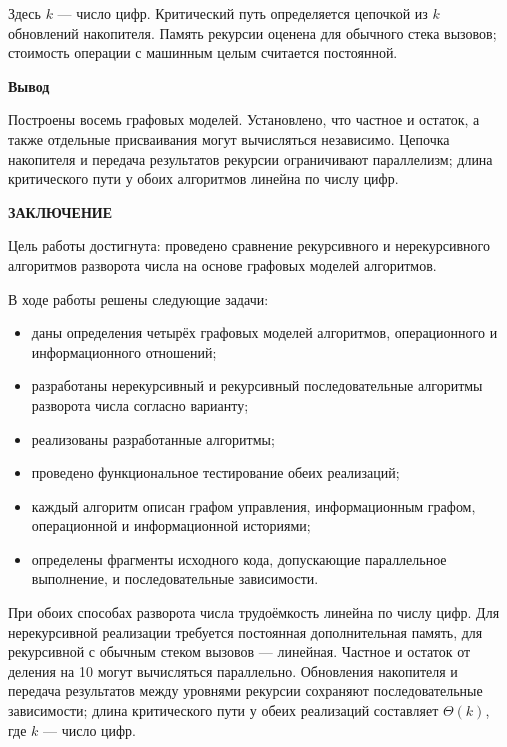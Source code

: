 \documentclass[14pt,a4paper]{extarticle}
\newcommand{\structhead}[1]{\clearpage\phantomsection\addcontentsline{toc}{section}{#1}\begin{center}\bfseries #1\end{center}\vspace{0.5em}}
\newcommand{\conclusion}[1]{\par\medskip\noindent\begin{minipage}{\linewidth}\setlength{\parindent}{1.25cm}\noindent\hspace*{\parindent}\textbf{Вывод}\par\indent #1\par\end{minipage}\par}
\numberwithin{equation}{section}
\numberwithin{figure}{section}
\numberwithin{table}{section}
\begin{document}
Здесь $k$ --- число цифр. Критический путь определяется цепочкой из $k$ обновлений накопителя. Память рекурсии оценена для обычного стека вызовов; стоимость операции с машинным целым считается постоянной.
\conclusion{Построены восемь графовых моделей. Установлено, что частное и остаток, а также отдельные присваивания могут вычисляться независимо. Цепочка накопителя и передача результатов рекурсии ограничивают параллелизм; длина критического пути у обоих алгоритмов линейна по числу цифр.}

\structhead{ЗАКЛЮЧЕНИЕ}
Цель работы достигнута: проведено сравнение рекурсивного и нерекурсивного алгоритмов разворота числа на основе графовых моделей алгоритмов.

В ходе работы решены следующие задачи:
\begin{itemize}
\item даны определения четырёх графовых моделей алгоритмов, операционного и информационного отношений;
\item разработаны нерекурсивный и рекурсивный последовательные алгоритмы разворота числа согласно варианту;
\item реализованы разработанные алгоритмы;
\item проведено функциональное тестирование обеих реализаций;
\item каждый алгоритм описан графом управления, информационным графом, операционной и информационной историями;
\item определены фрагменты исходного кода, допускающие параллельное выполнение, и последовательные зависимости.
\end{itemize}

При обоих способах разворота числа трудоёмкость линейна по числу цифр. Для нерекурсивной реализации требуется постоянная дополнительная память, для рекурсивной с обычным стеком вызовов --- линейная. Частное и остаток от деления на 10 могут вычисляться параллельно. Обновления накопителя и передача результатов между уровнями рекурсии сохраняют последовательные зависимости; длина критического пути у обеих реализаций составляет $\Theta(k)$, где $k$ --- число цифр.
\end{document}

